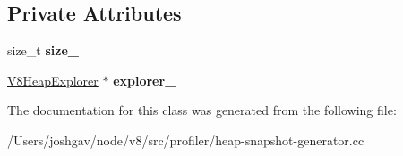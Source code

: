 \subsection*{Private Attributes}
\begin{DoxyCompactItemize}
\item 
size\+\_\+t {\bfseries size\+\_\+}\hypertarget{classv8_1_1internal_1_1_j_s_array_buffer_data_entry_allocator_aa83323a64fc3c062e9907cd75b373d4c}{}\label{classv8_1_1internal_1_1_j_s_array_buffer_data_entry_allocator_aa83323a64fc3c062e9907cd75b373d4c}

\item 
\hyperlink{classv8_1_1internal_1_1_v8_heap_explorer}{V8\+Heap\+Explorer} $\ast$ {\bfseries explorer\+\_\+}\hypertarget{classv8_1_1internal_1_1_j_s_array_buffer_data_entry_allocator_ab845c48d9848358340aa216b6b44a0b9}{}\label{classv8_1_1internal_1_1_j_s_array_buffer_data_entry_allocator_ab845c48d9848358340aa216b6b44a0b9}

\end{DoxyCompactItemize}


The documentation for this class was generated from the following file\+:\begin{DoxyCompactItemize}
\item 
/\+Users/joshgav/node/v8/src/profiler/heap-\/snapshot-\/generator.\+cc\end{DoxyCompactItemize}
